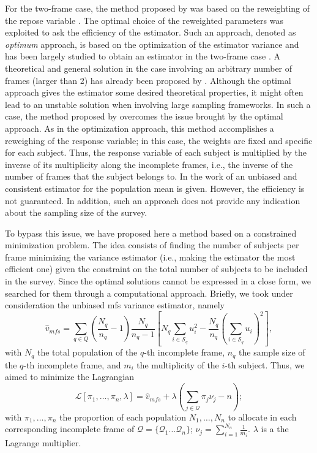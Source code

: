 For the two-frame case, the method proposed by \cite{hartley1962sampling} was based on the reweighting of the repose variable \cite{skinner1996estimation}.
The optimal choice of the reweighted parameters was exploited to ask the efficiency of the estimator.
Such an approach, denoted as \emph{optimum} approach, is based on the optimization of the estimator variance and has been largely studied to obtain an estimator in the two-frame case \cite{hartley1962sampling, fuller1972estimators, bankier1986estimators}. 
A theoretical and general solution in the case involving an arbitrary number of frames (larger than 2) has already been proposed by \cite{lohr2006multiple}.
Although the optimal approach gives the estimator some desired theoretical properties, it might often lead to an unstable solution when involving large sampling frameworks.
In such a case, the method proposed by \cite{mecatti2007single} overcomes the issue brought by the optimal approach.
As in the optimization approach, this method accomplishes a reweighing of the response variable; in this case, the weights are fixed and specific for each subject.
Thus, the response variable of each subject is multiplied by the inverse of its multiplicity along the incomplete frames, i.e., the inverse of the number of frames that the subject belongs to.
In the work of \cite{mecatti2007single} an unbiased and consistent estimator for the population mean is given.
However, the efficiency is not guaranteed.
In addition, such an approach does not provide any indication about the sampling size of the survey.

To bypass this issue, we have proposed here a method based on a constrained minimization problem.
The idea consists of finding the number of subjects per frame minimizing the variance estimator (i.e., making the estimator the most efficient one) given the constraint on the total number of subjects to be included in the survey.
Since the optimal solutions cannot be expressed in a close form, we searched for them through a computational approach. 
Briefly, we took under consideration the unbiased \gls{mfs} variance estimator, namely
\begin{equation}
    \hat{v}_{mfs} = \sum_{q \in Q} \left(\frac{N_q}{n_q}-1\right) \frac{N_q}{n_q -1}\left[N_q\sum_{i\in \mathcal{S}_{q}} u_{i}^{2} -\frac{N_q}{n_q}\left(\sum_{i\in \mathcal{S}_{q}} u_{i}\right)^{2}\right], 
\end{equation}
with $N_{q}$ the total population of the $q$-th incomplete frame, $n_{q}$ the sample size of the $q$-th incomplete frame, and $m_{i}$ the multiplicity of the $i$-th subject.
Thus, we aimed to minimize the Lagrangian
\begin{equation}
    \mathcal{L}[\pi_{1}, \dots, \pi_{n}, \lambda] = \hat{v}_{mfs} + \lambda \left(\sum_{j \in \mathcal{Q}}\pi_{j} \nu_{j}-n \right);
\end{equation}
with $\pi_{1}, \dots, \pi_{n}$ the proportion of each population $N_{1}, \dots, N_{n}$ to allocate in each corresponding incomplete frame of $\mathcal{Q} = \{\mathcal{Q}_1 \dots \mathcal{Q}_n\}$; $\nu_{j} = \sum_{i = 1}^{N_{n}}\frac{1}{m_{i}}$.
$\lambda$ is a the Lagrange multiplier.

